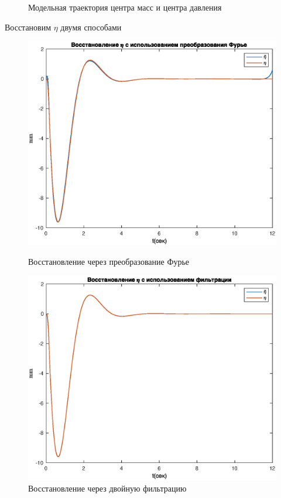 \documentclass[a4paper,12pt, openany]{book}
\theoremstyle{plain} %
\theoremstyle{definition} %
\theoremstyle{remark} %
\numberwithin{equation}{chapter}
\begin{document}
{\begin{figure}[h!]
\begin{center}
\begin{minipage}[h]{0.48\linewidth}
            \caption{Модельная траектория центра масс и центра давления}
        \end{minipage}
    \end{center}
\end{figure}

Восстановим $\eta$ двумя способами
\begin{figure}[h!]
    \begin{center}
        \begin{minipage}[h]{0.48\linewidth}
            \includegraphics[width=1\linewidth]{eta_restore_fur_model.eps}
            \caption{Восстановление через преобразование Фурье}
        \end{minipage}
        \hfill
        \begin{minipage}[h]{0.48\linewidth}
            \includegraphics[width=1\linewidth]{double_filter_model.eps}
            \caption{Восстановление через двойную фильтрацию}
        \end{minipage}
    \end{center}
\end{figure}


}
\end{document}
